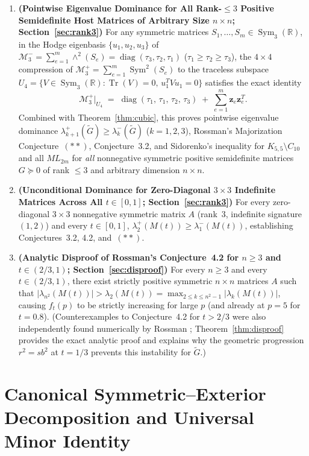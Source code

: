 \documentclass[11pt,a4paper]{article}
\theoremstyle{plain}
\theoremstyle{definition}
\theoremstyle{remark}
\DeclareMathOperator{\Tr}{Tr}
\DeclareMathOperator{\Sym}{Sym}
\DeclareMathOperator{\diag}{diag}
\begin{document}
\begin{enumerate}[label=\textbf{Theorem~\arabic*.},ref=\arabic*,leftmargin=6.5em]
  \item \textbf{(Pointwise Eigenvalue Dominance for All Rank-$\le 3$ Positive Semidefinite Host Matrices of Arbitrary Size $n \times n$; Section~\ref{sec:rank3})} For any symmetric matrices $S_1,\dots,S_m \in \Sym_3(\mathbb{R})$, in the Hodge eigenbasis $\{u_1,u_2,u_3\}$ of $\mathcal{M}_3^- = \sum_{e=1}^m \wedge^2(S_e) = \diag(\tau_3,\tau_2,\tau_1)$ ($\tau_1 \ge \tau_2 \ge \tau_3$), the $4 \times 4$ compression of $\mathcal{M}_3^+ = \sum_{e=1}^m \Sym^2(S_e)$ to the traceless subspace $U_4 = \{V \in \Sym_3(\mathbb{R}) : \Tr(V) = 0,\, u_1^T V u_1 = 0\}$ satisfies the exact identity
  \[
    \mathcal{M}_3^+\big|_{U_4} \;=\; \diag(\tau_1, \, \tau_1, \, \tau_2, \, \tau_3) \;+\; \sum_{e=1}^m \mathbf{z}_e \mathbf{z}_e^T.
  \]
  Combined with Theorem~\ref{thm:cubic}, this proves pointwise eigenvalue dominance $\lambda_{k+1}^+(\widetilde{G}) \ge \lambda_k^-(\widetilde{G})$ ($k = 1, 2, 3$), Rossman's Majorization Conjecture~$(**)$, Conjecture~3.2, and Sidorenko's inequality for $K_{5,5} \setminus C_{10}$ and all $ML_{2m}$ for \emph{all} nonnegative symmetric positive semidefinite matrices $G \succeq 0$ of rank $\le 3$ and arbitrary dimension $n \times n$.
  \item \textbf{(Unconditional Dominance for Zero-Diagonal $3 \times 3$ Indefinite Matrices Across All $t \in [0,1]$; Section~\ref{sec:rank3})} For every zero-diagonal $3 \times 3$ nonnegative symmetric matrix $A$ (rank~$3$, indefinite signature $(1,2)$) and every $t \in [0,1]$, $\lambda_2^+(M(t)) \ge \lambda_1^-(M(t))$, establishing Conjectures~3.2, 4.2, and~$(**)$.
  \item \textbf{(Analytic Disproof of Rossman's Conjecture~4.2 for $n \ge 3$ and $t \in (2/3, 1)$; Section~\ref{sec:disproof})} For every $n \ge 3$ and every $t \in (2/3, 1)$, there exist strictly positive symmetric $n \times n$ matrices $A$ such that $|\lambda_{n^2}(M(t))| > \lambda_2(M(t)) = \max_{2 \le k \le n^2-1}|\lambda_k(M(t))|$, causing $f_t(p)$ to be strictly increasing for large $p$ (and already at $p = 5$ for $t = 0.8$). (Counterexamples to Conjecture~4.2 for $t > 2/3$ were also independently found numerically by Rossman \cite{RossmanPersonal2026}; Theorem~\ref{thm:disproof} provides the exact analytic proof and explains why the geometric progression $r^2 = s b^2$ at $t = 1/3$ prevents this instability for $\widetilde{G}$.)
\end{enumerate}

\section{Canonical Symmetric--Exterior Decomposition and Universal Minor Identity}\label{sec:decomp}
\end{document}
